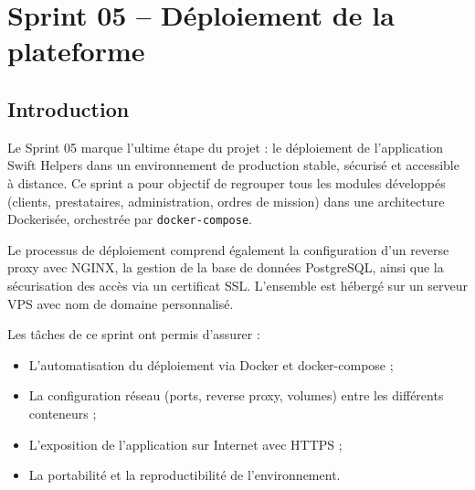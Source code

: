 \chapter{Sprint 05 – Déploiement de la plateforme}
\section*{Introduction}

Le Sprint 05 marque l’ultime étape du projet : le déploiement de l’application Swift Helpers dans un environnement de production stable, sécurisé et accessible à distance. Ce sprint a pour objectif de regrouper tous les modules développés (clients, prestataires, administration, ordres de mission) dans une architecture Dockerisée, orchestrée par \texttt{docker-compose}.

Le processus de déploiement comprend également la configuration d’un reverse proxy avec NGINX, la gestion de la base de données PostgreSQL, ainsi que la sécurisation des accès via un certificat SSL. L’ensemble est hébergé sur un serveur VPS avec nom de domaine personnalisé.

Les tâches de ce sprint ont permis d’assurer :
\begin{itemize}
  \item L’automatisation du déploiement via Docker et docker-compose ;
  \item La configuration réseau (ports, reverse proxy, volumes) entre les différents conteneurs ;
  \item L’exposition de l’application sur Internet avec HTTPS ;
  \item La portabilité et la reproductibilité de l’environnement.
\end{itemize}


